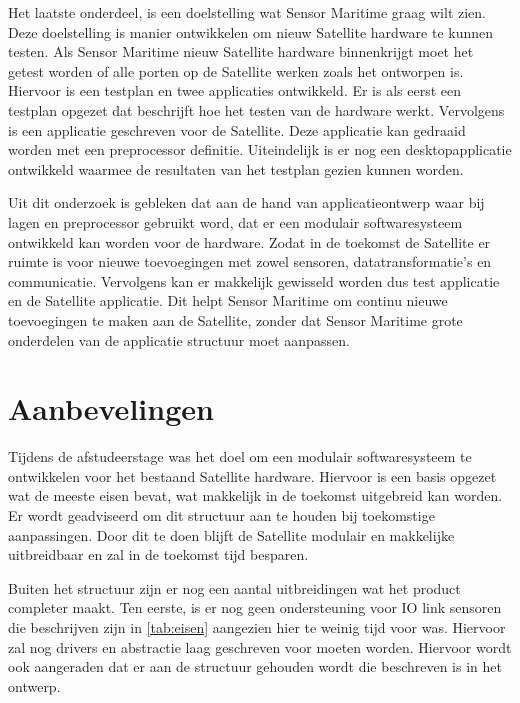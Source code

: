 \noindent Het laatste onderdeel, is een doelstelling wat Sensor Maritime graag wilt zien. Deze doelstelling is manier ontwikkelen om nieuw Satellite hardware te kunnen testen. Als Sensor Maritime nieuw Satellite hardware binnenkrijgt moet het getest worden of alle porten op de Satellite werken zoals het ontworpen is. Hiervoor is een testplan en twee applicaties ontwikkeld. Er is als eerst een testplan opgezet dat beschrijft hoe het testen van de hardware werkt. Vervolgens is een applicatie geschreven voor de Satellite. Deze applicatie kan gedraaid worden met een preprocessor definitie. Uiteindelijk is er nog een desktopapplicatie ontwikkeld waarmee de resultaten van het testplan gezien kunnen worden. \newline

\noindent  Uit dit onderzoek is gebleken dat aan de hand van applicatieontwerp waar bij lagen en preprocessor gebruikt word, dat er een modulair softwaresysteem ontwikkeld kan worden voor de hardware. Zodat in de toekomst de Satellite er ruimte is voor nieuwe toevoegingen met zowel sensoren, datatransformatie's en communicatie. Vervolgens kan er makkelijk gewisseld worden dus test applicatie en de Satellite applicatie. Dit helpt Sensor Maritime om continu nieuwe toevoegingen te maken aan de Satellite, zonder dat Sensor Maritime grote onderdelen van de applicatie structuur moet aanpassen.




\newpage
\section{Aanbevelingen}
Tijdens de afstudeerstage was het doel om een modulair softwaresysteem te ontwikkelen voor het bestaand Satellite hardware. Hiervoor is een basis opgezet wat de meeste eisen bevat, wat makkelijk in de toekomst uitgebreid kan worden. Er wordt geadviseerd om dit structuur aan te houden bij toekomstige aanpassingen. Door dit te doen blijft de Satellite modulair en makkelijke uitbreidbaar en zal in de toekomst tijd besparen. \newline 

\noindent Buiten het structuur zijn er nog een aantal uitbreidingen wat het product completer maakt. Ten eerste, is er nog geen ondersteuning voor IO link sensoren die beschrijven zijn in \ref{tab:eisen} aangezien hier te weinig tijd voor was. Hiervoor zal nog drivers en abstractie laag geschreven voor moeten worden. Hiervoor wordt ook aangeraden dat er aan de structuur gehouden wordt die beschreven is in het ontwerp. \newline


